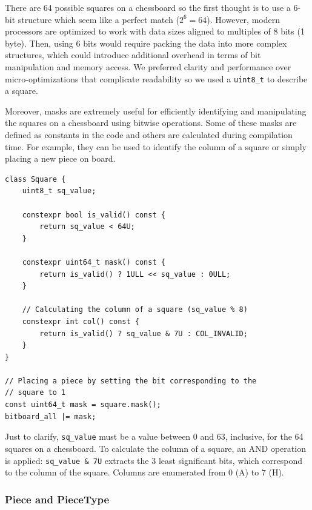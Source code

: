 There are 64 possible squares on a chessboard so the first thought is to use a 6-bit structure which seem like a perfect match ($2^6 = 64$). However, modern processors are optimized to work with data sizes aligned to multiples of 8 bits (1 byte). Then, using 6 bits would require packing the data into more complex structures, which could introduce additional overhead in terms of bit manipulation and memory access. We preferred clarity and performance over micro-optimizations that complicate readability so we used a \texttt{uint8\_t} to describe a square.

\vspace{1em}

\noindent Moreover, masks are extremely useful for efficiently identifying and manipulating the squares on a chessboard using bitwise operations. Some of these masks are defined as constants in the code and others are calculated during compilation time. For example, they can be used to identify the column of a square or simply placing a new piece on board.

\begin{lstlisting}[breaklines=true, frame=single, caption={Square class.}]
class Square {
    uint8_t sq_value;

    constexpr bool is_valid() const {
        return sq_value < 64U;
    }

    constexpr uint64_t mask() const {
        return is_valid() ? 1ULL << sq_value : 0ULL;
    }

    // Calculating the column of a square (sq_value % 8)
    constexpr int col() const {
        return is_valid() ? sq_value & 7U : COL_INVALID;
    }
}

// Placing a piece by setting the bit corresponding to the
// square to 1
const uint64_t mask = square.mask();
bitboard_all |= mask;
\end{lstlisting}

\noindent Just to clarify, \texttt{sq\_value} must be a value between $0$ and $63$, inclusive, for the 64 squares on a chessboard. To calculate the column of a square, an AND operation is applied: \texttt{sq\_value \& 7U} extracts the 3 least significant bits, which correspond to the column of the square. Columns are enumerated from $0$ (A) to $7$ (H).

\subsubsection{Piece and PieceType}

